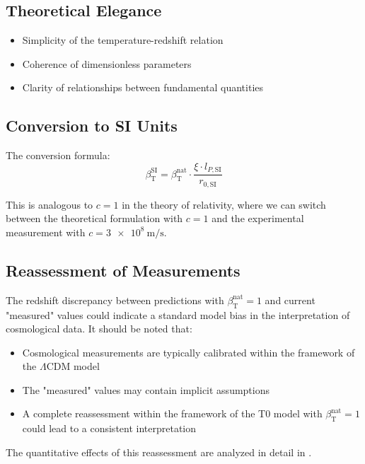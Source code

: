\documentclass[12pt,a4paper]{article}
\newcommand{\betaT}{\beta_{\text{T}}}
\begin{document}
	\subsection{Theoretical Elegance}
	
	\begin{itemize}
		\item Simplicity of the temperature-redshift relation
		\item Coherence of dimensionless parameters
		\item Clarity of relationships between fundamental quantities
	\end{itemize}
	
	\subsection{Conversion to SI Units}
	
	The conversion formula:
	\begin{equation}
		\betaT^{\text{SI}} = \betaT^{\text{nat}} \cdot \frac{\xi \cdot l_{P,\text{SI}}}{r_{0,\text{SI}}}
	\end{equation}
	
	This is analogous to \(c = 1\) in the theory of relativity, where we can switch between the theoretical formulation with \(c = 1\) and the experimental measurement with \(c = \SI{3e8}{\meter\per\second}\).
	
	\subsection{Reassessment of Measurements}
	
	The redshift discrepancy between predictions with \(\betaT^{\text{nat}} = 1\) and current "measured" values could indicate a standard model bias in the interpretation of cosmological data. It should be noted that:
	\begin{itemize}
		\item Cosmological measurements are typically calibrated within the framework of the \(\Lambda\)CDM model
		\item The "measured" values may contain implicit assumptions
		\item A complete reassessment within the framework of the T0 model with \(\betaT^{\text{nat}} = 1\) could lead to a consistent interpretation
	\end{itemize}
	
	The quantitative effects of this reassessment are analyzed in detail in \cite{pascher_alphabeta_2025}.
	
\end{document}
